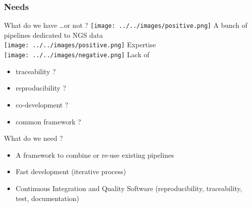 \begin{frame}
 \frametitle{Needs}

    \begin{block}{What do we have \dots or not ?}
     \texttt{[image: ../../images/positive.png]}\; A bunch of pipelines dedicated
to NGS data\\
     \texttt{[image: ../../images/positive.png]}\; Expertise\\
     \texttt{[image: ../../images/negative.png]}\; Lack of \\
    \begin{itemize}
     \item traceability ?
     \item reproducibility ?
     \item co-development ?
     \item common framework ?
    \end{itemize}
    \end{block}

    \begin{block}{What do we need ?}
    \begin{itemize}
     \item A framework to combine or re-use existing pipelines
     \item Fast development (iterative process)
     \item Continuous Integration and Quality Software (reproducibility, 
           traceability, test, documentation)
    \end{itemize}
    \end{block}
\end{frame}

